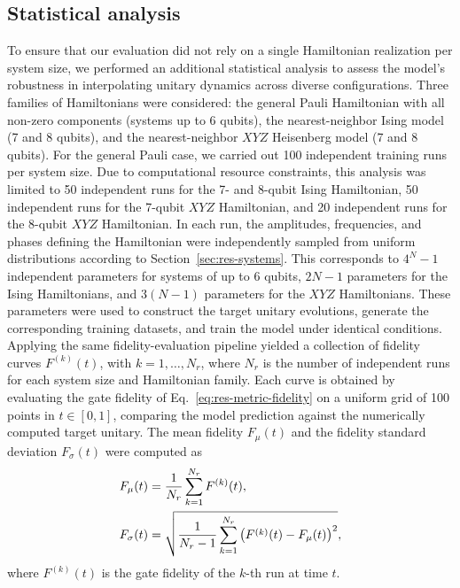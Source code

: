 \subsection{Statistical analysis}
\label{sec:res-statistics}

To ensure that our evaluation did not rely on a single Hamiltonian realization per system size, we performed an additional statistical analysis to assess the model's robustness in interpolating unitary dynamics across diverse configurations. Three families of Hamiltonians were considered: the general Pauli Hamiltonian with all non-zero components (systems up to 6 qubits), the nearest-neighbor Ising model (7 and 8 qubits), and the nearest-neighbor $XYZ$ Heisenberg model (7 and 8 qubits). For the general Pauli case, we carried out 100 independent training runs per system size. Due to computational resource constraints, this analysis was limited to 50 independent runs for the 7- and 8-qubit Ising Hamiltonian, 50 independent runs for the 7-qubit $XYZ$ Hamiltonian, and 20 independent runs for the 8-qubit $XYZ$ Hamiltonian. In each run, the amplitudes, frequencies, and phases defining the Hamiltonian were independently sampled from uniform distributions according to Section~\ref{sec:res-systems}. This corresponds to $4^N - 1$ independent parameters for systems of up to 6 qubits, $2N - 1$ parameters for the Ising Hamiltonians, and $3(N-1)$ parameters for the $XYZ$ Hamiltonians. These parameters were used to construct the target unitary evolutions, generate the corresponding training datasets, and train the model under identical conditions. Applying the same fidelity-evaluation pipeline yielded a collection of fidelity curves $F^{(k)}(t)$, with $k = 1, \ldots, N_r$, where $N_r$ is the number of independent runs for each system size and Hamiltonian family. Each curve is obtained by evaluating the gate fidelity of Eq.~\eqref{eq:res-metric-fidelity} on a uniform grid of 100 points in $t \in [0,1]$, comparing the model prediction against the numerically computed target unitary. The mean fidelity $F_{\mu}(t)$ and the fidelity standard deviation $F_{\sigma}(t)$ were computed as
\begin{align}
  F_{\mu}(t) &= \frac{1}{N_r} \sum_{k=1}^{N_r} F^{(k)}(t), \\
  F_{\sigma}(t) &= \sqrt{ \frac{1}{N_r-1} \sum_{k=1}^{N_r} \qty( F^{(k)}(t) - F_{\mu}(t) )^2 },
\end{align}
where $F^{(k)}(t)$ is the gate fidelity of the $k$-th run at time $t$.

